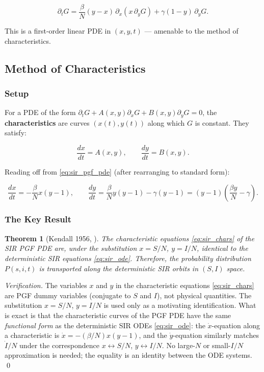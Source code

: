 \documentclass[11pt,a4paper]{article}
\newtheorem{theorem}{Theorem}[section]
\theoremstyle{definition}
\begin{document}
\begin{equation}
  \partial_t G = \frac{\beta}{N}(y - x)\,\partial_x(x\,\partial_y G)
                + \gamma(1 - y)\,\partial_y G.
  \label{eq:sir_pgf_pde}
\end{equation}

This is a first-order linear PDE in $(x, y, t)$ --- amenable to the method of
characteristics.

\subsection{Method of Characteristics}

\subsubsection{Setup}

For a PDE of the form $\partial_t G + A(x,y)\partial_x G + B(x,y)\partial_y G = 0$,
the \textbf{characteristics} are curves $(x(t), y(t))$ along which $G$ is constant.
They satisfy:

\[
  \frac{dx}{dt} = A(x,y), \qquad \frac{dy}{dt} = B(x,y).
\]

Reading off from \eqref{eq:sir_pgf_pde} (after rearranging to standard form):

\begin{equation}
  \frac{dx}{dt} = -\frac{\beta}{N} x(y-1), \qquad
  \frac{dy}{dt} = \frac{\beta}{N} y(y-1) - \gamma(y-1) = (y-1)\!\left(\frac{\beta y}{N} - \gamma\right).
  \label{eq:sir_chars}
\end{equation}

\subsubsection{The Key Result}

\begin{theorem}[Kendall 1956, \cite{kendall1956}]
The characteristic equations \eqref{eq:sir_chars} of the SIR PGF PDE are, under
the substitution $x = S/N$, $y = I/N$, identical to the deterministic SIR
equations \eqref{eq:sir_ode}. Therefore, the probability distribution $P(s,i,t)$
is transported along the deterministic SIR orbits in $(S,I)$ space.
\end{theorem}

\begin{proof}[Verification]
The variables $x$ and $y$ in the characteristic equations \eqref{eq:sir_chars} are
PGF dummy variables (conjugate to $S$ and $I$), not physical quantities. The
substitution $x = S/N$, $y = I/N$ is used only as a motivating identification.
What is exact is that the characteristic curves of the PGF PDE have the same
\emph{functional form} as the deterministic SIR ODEs \eqref{eq:sir_ode}:
the $\dot{x}$-equation along a characteristic is $\dot{x} = -(\beta/N)x(y-1)$,
and the $\dot{y}$-equation similarly matches $\dot{I}/N$ under the correspondence
$x \leftrightarrow S/N$, $y \leftrightarrow I/N$. No large-$N$ or small-$I/N$
approximation is needed; the equality is an identity between the ODE systems. \qed
\end{proof}
\end{document}

